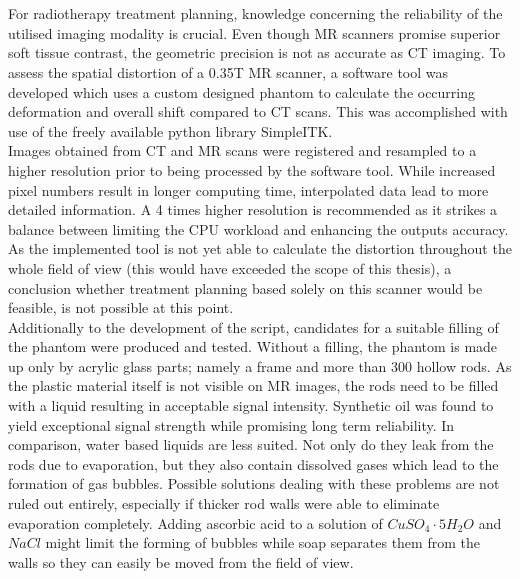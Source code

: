 
\let\oldcleardoublepage\cleardoublepage
\renewcommand\cleardoublepage{}

\chapter*{\abstractname}

For radiotherapy treatment planning, knowledge concerning the reliability of the utilised imaging modality is crucial.
Even though MR scanners promise superior soft tissue contrast, the geometric precision is not as accurate as CT imaging.
To assess the spatial distortion of a 0.35T MR scanner, a software tool was developed which uses a custom designed phantom to calculate the occurring deformation and overall shift compared to CT scans.
This was accomplished with use of the freely available python library {SimpleITK}.\\
Images obtained from CT and MR scans were registered and resampled to a higher resolution prior to being processed by the software tool.
While increased pixel numbers result in longer computing time, interpolated data lead to more detailed information.
A 4 times higher resolution is recommended as it strikes a balance between limiting the CPU workload and enhancing the outputs accuracy.
As the implemented tool is not yet able to calculate the distortion throughout the whole field of view (this would have exceeded the scope of this thesis), a conclusion whether treatment planning based solely on this scanner would be feasible, is not possible at this point.\\

Additionally to the development of the script, candidates for a suitable filling of the phantom were produced and tested.
Without a filling, the phantom is made up only by acrylic glass parts; namely a frame and more than 300 hollow rods.
As the plastic material itself is not visible on MR images, the rods need to be filled with a liquid resulting in acceptable signal intensity.
Synthetic oil was found to yield exceptional signal strength while promising long term reliability.
In comparison, water based liquids are less suited.
Not only do they leak from the rods due to evaporation, but they also contain dissolved gases which lead to the formation of gas bubbles.
Possible solutions dealing with these problems are not ruled out entirely, especially if thicker rod walls were able to eliminate evaporation completely.
Adding ascorbic acid to a solution of $CuSO_4\cdot5H_2O$ and $NaCl$ might limit the forming of bubbles while soap separates them from the walls so they can easily be moved from the field of view.\\

